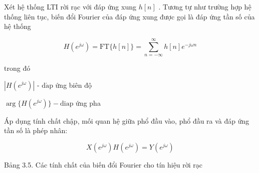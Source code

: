 \documentclass[
  10
]{article}
\begin{document}
Xét hệ thống LTI rời rạc với đáp ứng xung \(h [ n ]\) . Tương tự như
trường hợp hệ thống liên tục, biến đổi Fourier của đáp ứng xung được gọi
là đáp ứng tần số của hệ thống

\[
H (e ^ {j \omega}) = \mathrm{FT} \{h [ n ] \} = \sum_ {n = - \infty} ^ {\infty} h [ n ] e ^ {- j \omega n}
\]

trong đó

\(\left| H ( e ^ { j \omega } ) \right| \textrm { - } \mathrm { d } \mathrm { { \acute { a } p } }\)
ứng biên độ

\(\arg \{ H ( e ^ { j \omega } ) \} - \mathrm { d i a p }\) ứng pha

Áp dụng tính chất chập, mối quan hệ giữa phổ đầu vào, phổ đầu ra và đáp
ứng tần số là phép nhân:

\[
X (e ^ {j \omega}) H (e ^ {j \omega}) = Y (e ^ {j \omega})
\]

Bảng 3.5. Các tính chất của biến đổi Fourier cho tín hiệu rời rạc
\end{document}
